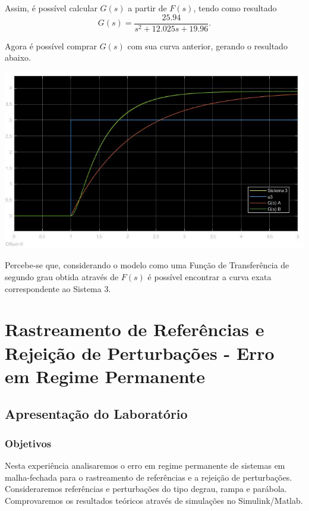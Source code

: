 \documentclass[
]{book}
\begin{document}
Assim, é possível calcular \(G(s)\) a partir de \(F(s)\), tendo como resultado
\[
G(s) = \frac {25.94}{s^2+12.025s+19.96}.
\]

Agora é possível comprar \(G(s)\) com sua curva anterior, gerando o resultado abaixo.

\includegraphics{Imagens/Lab3/Resolução/prob3BB.jpg}

Percebe-se que, considerando o modelo como uma Função de Transferência de segundo grau obtida através de \(F(s)\) é possível encontrar a curva exata correspondente ao Sistema 3.

\hypertarget{rastreamento-de-referuxeancias-e-rejeiuxe7uxe3o-de-perturbauxe7uxf5es---erro-em-regime-permanente}{%
\chapter{Rastreamento de Referências e Rejeição de Perturbações - Erro em Regime Permanente}\label{rastreamento-de-referuxeancias-e-rejeiuxe7uxe3o-de-perturbauxe7uxf5es---erro-em-regime-permanente}}

\hypertarget{apresentauxe7uxe3o-do-laboratuxf3rio-2}{%
\section{Apresentação do Laboratório}\label{apresentauxe7uxe3o-do-laboratuxf3rio-2}}

\hypertarget{objetivos}{%
\subsection{Objetivos}\label{objetivos}}

Nesta experiência analisaremos o erro em regime permanente de sistemas em malha-fechada para o rastreamento de referências e a rejeição de perturbações. Consideraremos referências e perturbações do tipo degrau, rampa e parábola. Comprovaremos os resultados teóricos através de simulações no Simulink/Matlab.
\end{document}
